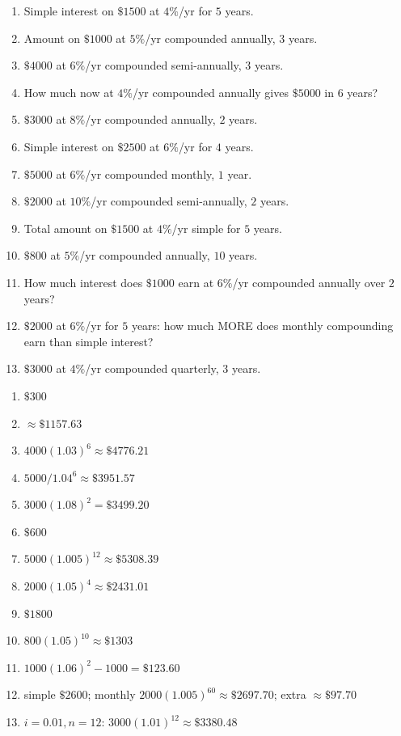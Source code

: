 \documentclass[11pt]{article}
\begin{document}
\begin{recapbox}
\begin{multicols}{2}
\small
\begin{enumerate}[leftmargin=*,itemsep=3pt]
  \item Simple interest on $\$1500$ at $4\%$/yr for $5$ years.
  \item Amount on $\$1000$ at $5\%$/yr compounded annually, $3$ years.
  \item $\$4000$ at $6\%$/yr compounded semi-annually, $3$ years.
  \item How much now at $4\%$/yr compounded annually gives $\$5000$ in $6$ years?
  \item $\$3000$ at $8\%$/yr compounded annually, $2$ years.
  \item Simple interest on $\$2500$ at $6\%$/yr for $4$ years.
  \item $\$5000$ at $6\%$/yr compounded monthly, $1$ year.
  \item $\$2000$ at $10\%$/yr compounded semi-annually, $2$ years.
  \item Total amount on $\$1500$ at $4\%$/yr simple for $5$ years.
  \item $\$800$ at $5\%$/yr compounded annually, $10$ years.
  \item How much interest does $\$1000$ earn at $6\%$/yr compounded annually over $2$ years?
  \item $\$2000$ at $6\%$/yr for $5$ years: how much MORE does monthly compounding earn than simple interest?
  \item $\$3000$ at $4\%$/yr compounded quarterly, $3$ years.
\end{enumerate}
\end{multicols}
\end{recapbox}

\begin{keybox}
\begin{multicols}{2}
\small
\begin{enumerate}[leftmargin=*,itemsep=3pt]
  \item $\$300$
  \item $\approx\$1157.63$
  \item $4000(1.03)^6\approx\$4776.21$
  \item $5000/1.04^6\approx\$3951.57$
  \item $3000(1.08)^2=\$3499.20$
  \item $\$600$
  \item $5000(1.005)^{12}\approx\$5308.39$
  \item $2000(1.05)^4\approx\$2431.01$
  \item $\$1800$
  \item $800(1.05)^{10}\approx\$1303$
  \item $1000(1.06)^2-1000=\$123.60$
  \item simple $\$2600$; monthly $2000(1.005)^{60}\approx\$2697.70$; extra $\approx\$97.70$
  \item $i=0.01,n=12$: $3000(1.01)^{12}\approx\$3380.48$
\end{enumerate}
\end{multicols}
\end{keybox}
\end{document}
